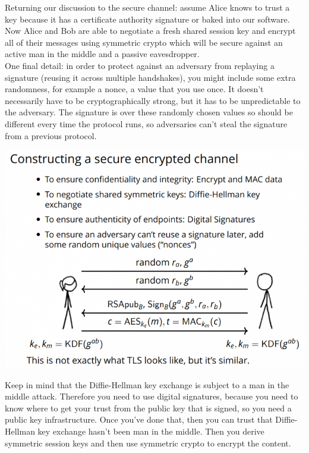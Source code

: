 \documentclass[11pt]{article} %
\begin{document}
\begin{itemize}
Returning our discussion to the secure channel: assume Alice knows to trust a key because it has a certificate authority signature or baked into our software. Now Alice and Bob are able to negotiate a fresh shared session key and encrypt all of their messages using symmetric crypto which will be secure against an active man in the middle and a passive eavesdropper.\\

{\parindent11pt One final detail: in order to protect against an adversary from replaying a signature (reusing it across multiple handshakes), you might include some extra randomness, for example a nonce, a value that you use once. It doesn't necessarily have to be cryptographically strong, but it has to be unpredictable to 
the adversary. The signature is over these randomly chosen values so should be different every time the protocol runs, so adversaries can't steal the signature from a previous protocol.}

  \includegraphics[scale=0.6]{./Trust-in-keys3.png}

Keep in mind that the Diffie-Hellman key exchange is subject to a man in the middle attack. Therefore you need to use digital signatures, because you need to know where to get your trust from the public key that is signed, so you need a public key infrastructure. Once you've done that, then you can trust that Diffie-Hellman key exchange hasn't been man in the middle. Then you derive symmetric session keys and then use symmetric crypto to encrypt the content.

\end{itemize}
\end{document}
